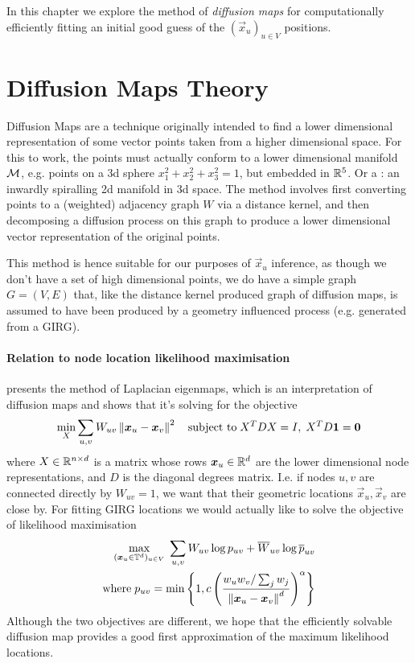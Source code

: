 In this chapter we explore the method of \textit{diffusion maps} for computationally efficiently fitting an initial good guess of the $(\vec{x}_u)_{u \in V}$ positions.

\section{Diffusion Maps Theory}
\label{sec:diff_maps_theory_major}
Diffusion Maps \cite{coifman2006diffusion} are a technique originally intended to find a lower dimensional representation of some vector points taken from a higher dimensional space. For this to work, the points must actually conform to a lower dimensional manifold $\mathcal{M}$, e.g. points on a 3d sphere $x_1^2 + x_2^2 + x_3^2 = 1$, but embedded in $\mathbb{R}^5$. Or a : an inwardly spiralling 2d manifold in 3d space. The method involves first converting points to a (weighted) adjacency graph $W$ via a distance kernel, and then decomposing a diffusion process on this graph to produce a lower dimensional vector representation of the original points.

This method is hence suitable for our purposes of $\vec{x}_u$ inference, as though we don't have a set of high dimensional points, we do have a simple graph $G = (V,E)$ that, like the distance kernel produced graph of diffusion maps, is assumed to have been produced by a geometry influenced process (e.g. generated from a GIRG).

\paragraph{Relation to node location likelihood maximisation}
\cite{belkin2001laplacian} presents the method of Laplacian eigenmaps, which is an interpretation of diffusion maps and shows that it's solving for the objective
\begin{equation*}
  \min_{X} \sum_{u, v} W_{uv} \left\lVert \bm{x}_u - \bm{x}_v\right\rVert^2 \quad \text{subject to}\; X^T D X = I,\; X^T D\bm{1} = \bm{0} 
\end{equation*}
where $X \in \mathbb{R}^{n \times d}$ is a  matrix whose rows $\bm{x}_u \in \mathbb{R}^d$ are the lower dimensional node representations, and $D$ is the diagonal degrees matrix. I.e. if nodes $u, v$ are connected directly by $W_{uv} = 1$, we want that their geometric locations $\vec{x}_u, \vec{x}_v$ are close by.
For fitting GIRG locations we would actually like to solve the objective of likelihood maximisation
\begin{align*}
  \max\limits_{(\bm{x}_u \in \mathbb{T}^d)_{u \in V}} \;
  \sum_{u, v} W_{uv} \log p_{uv} + \overline{W}_{uv} \log \overline{p}_{uv}
  \\
  \text{where}\; p_{uv} = \min \left \{
    1, c \left ( \frac{w_u w_v / \sum_j w_j}{\left\lVert \bm{x}_u - \bm{x}_v\right\rVert^d} \right )^\alpha
  \right \}
\end{align*}
Although the two objectives are different, we hope that the efficiently solvable diffusion map provides a good first approximation of the maximum likelihood locations.

